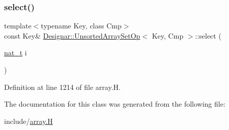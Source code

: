 \subsubsection{\texorpdfstring{select()}{select()}}
{\footnotesize\ttfamily template$<$typename Key, class Cmp$>$ \\
const Key\& \hyperlink{class_designar_1_1_unsorted_array_set_op}{Designar\+::\+Unsorted\+Array\+Set\+Op}$<$ Key, Cmp $>$\+::select (\begin{DoxyParamCaption}\item[{\hyperlink{namespace_designar_aa72662848b9f4815e7bf31a7cf3e33d1}{nat\+\_\+t}}]{i }\end{DoxyParamCaption})\hspace{0.3cm}{\ttfamily [inline]}}



Definition at line 1214 of file array.\+H.



The documentation for this class was generated from the following file\+:\begin{DoxyCompactItemize}
\item 
include/\hyperlink{array_8_h}{array.\+H}\end{DoxyCompactItemize}
